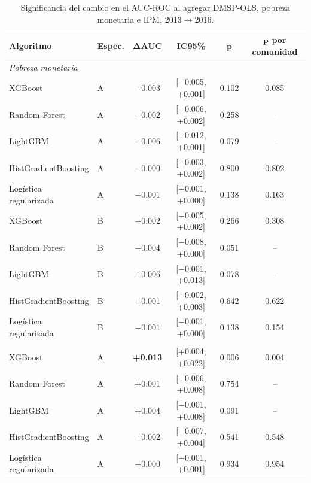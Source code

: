 \begin{table}[H]
  \centering
  \caption{Significancia del cambio en el AUC-ROC al agregar DMSP-OLS,
  pobreza monetaria e IPM, 2013$\to$2016.}
  \label{tab:significancia_dmsp_ipm}
  \footnotesize
  \setlength{\tabcolsep}{6pt}
  \begin{tabular}{llcccc}
    \toprule
    \textbf{Algoritmo} & \textbf{Espec.} & $\boldsymbol{\Delta}$\textbf{AUC} & \textbf{IC95\%} & $\boldsymbol{p}$ & $\boldsymbol{p}$ \textbf{por comunidad} \\
    \midrule
    \multicolumn{6}{l}{\textit{Pobreza monetaria}} \\
    XGBoost                  & A & $-$0.003 & [$-$0.005, +0.001] & 0.102 & 0.085 \\
    Random Forest            & A & $-$0.002 & [$-$0.006, +0.002] & 0.258 & -- \\
    LightGBM                 & A & $-$0.006 & [$-$0.012, +0.001] & 0.079 & -- \\
    HistGradientBoosting     & A & $-$0.000 & [$-$0.003, +0.002] & 0.800 & 0.802 \\
    Logística regularizada   & A & $-$0.001 & [$-$0.001, +0.000] & 0.138 & 0.163 \\
    \addlinespace
    XGBoost                  & B & $-$0.002 & [$-$0.005, +0.002] & 0.266 & 0.308 \\
    Random Forest            & B & $-$0.004 & [$-$0.008, +0.000] & 0.051 & -- \\
    LightGBM                 & B & +0.006 & [$-$0.001, +0.013] & 0.078 & -- \\
    HistGradientBoosting     & B & +0.001 & [$-$0.002, +0.003] & 0.642 & 0.622 \\
    Logística regularizada   & B & $-$0.001 & [$-$0.001, +0.000] & 0.138 & 0.154 \\
    \addlinespace
    \multicolumn{6}{l}{\textit{Pobreza multidimensional (IPM)}} \\
    XGBoost                  & A & \textbf{+0.013} & [+0.004, +0.022] & 0.006 & 0.004 \\
    Random Forest            & A & +0.001 & [$-$0.006, +0.008] & 0.754 & -- \\
    LightGBM                 & A & +0.004 & [$-$0.001, +0.008] & 0.091 & -- \\
    HistGradientBoosting     & A & $-$0.002 & [$-$0.007, +0.004] & 0.541 & 0.548 \\
    Logística regularizada   & A & $-$0.000 & [$-$0.001, +0.001] & 0.934 & 0.954 \\

\end{tabular}
\end{table}
